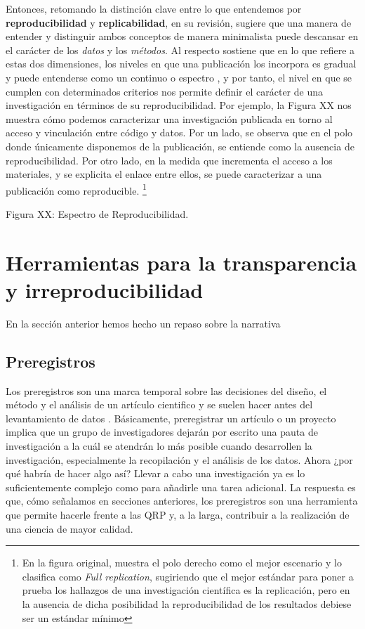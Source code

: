 \documentclass[
]{book}
\begin{document}
Entonces, retomando la distinción clave entre lo que entendemos por \textbf{reproducibilidad} y \textbf{replicabilidad}, en su revisión, \citet{barba_Terminologies_2018} sugiere que una manera de entender y distinguir ambos conceptos de manera minimalista puede descansar en el carácter de los \emph{datos} y los \emph{métodos}. Al respecto \citet{nosek_Promoting_2015} sostiene que en lo que refiere a estas dos dimensiones, los niveles en que una publicación los incorpora es gradual y puede entenderse como un continuo o espectro \citep{peng_Reproducible_2011}, y por tanto, el nivel en que se cumplen con determinados criterios nos permite definir el carácter de una investigación en términos de su reproducibilidad. Por ejemplo, la Figura XX nos muestra cómo podemos caracterizar una investigación publicada en torno al acceso y vinculación entre código y datos. Por un lado, se observa que en el polo donde únicamente disponemos de la publicación, se entiende como la ausencia de reproducibilidad. Por otro lado, en la medida que incrementa el acceso a los materiales, y se explicita el enlace entre ellos, se puede caracterizar a una publicación como reproducible. \footnote{En la figura original, \citet{peng_Reproducible_2011} muestra el polo derecho como el mejor escenario y lo clasifica como \emph{Full replication}, sugiriendo que el mejor estándar para poner a prueba los hallazgos de una investigación científica es la replicación, pero en la ausencia de dicha posibilidad la reproducibilidad de los resultados debiese ser un estándar mínimo}

Figura XX: Espectro de Reproducibilidad.

\hypertarget{herramientas-para-la-transparencia-y-irreproducibilidad}{%
\chapter{Herramientas para la transparencia y irreproducibilidad}\label{herramientas-para-la-transparencia-y-irreproducibilidad}}

En la sección anterior hemos hecho un repaso sobre la narrativa

\hypertarget{preregistros}{%
\section{Preregistros}\label{preregistros}}

Los preregistros son una marca temporal sobre las decisiones del diseño, el método y el análisis de un artículo cientifico y se suelen hacer antes del levantamiento de datos \citep{stewart_Preregistration_2020}. Básicamente, preregistrar un artículo o un proyecto implica que un grupo de investigadores dejarán por escrito una pauta de investigación a la cuál se atendrán lo más posible cuando desarrollen la investigación, especialmente la recopilación y el análisis de los datos. Ahora ¿por qué habría de hacer algo así? Llevar a cabo una investigación ya es lo suficientemente complejo como para añadirle una tarea adicional. La respuesta es que, cómo señalamos en secciones anteriores, los preregistros son una herramienta que permite hacerle frente a las QRP y, a la larga, contribuir a la realización de una ciencia de mayor calidad.
\end{document}
